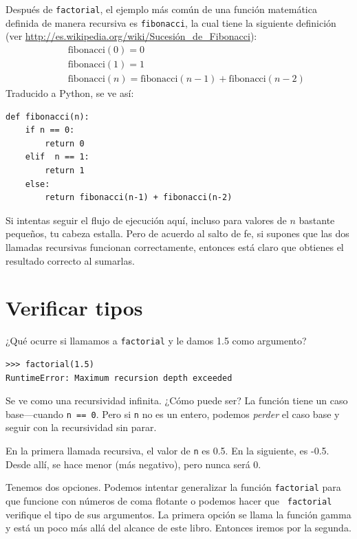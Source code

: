 \documentclass[10pt]{book}
\begin{document}
Después de {\tt factorial}, el ejemplo más común de una función
matemática definida de manera recursiva es {\tt fibonacci}, la cual tiene la
siguiente definición (ver
  \url{http://es.wikipedia.org/wiki/Sucesión_de_Fibonacci}):
%
\begin{eqnarray*}
&& \mathrm{fibonacci}(0) = 0 \\
&& \mathrm{fibonacci}(1) = 1 \\
&& \mathrm{fibonacci}(n) = \mathrm{fibonacci}(n-1) + \mathrm{fibonacci}(n-2)
\end{eqnarray*}
%
Traducido a Python, se ve así:

\begin{verbatim}
def fibonacci(n):
    if n == 0:
        return 0
    elif  n == 1:
        return 1
    else:
        return fibonacci(n-1) + fibonacci(n-2)
\end{verbatim}
%
Si intentas seguir el flujo de ejecución aquí, incluso para valores
de $n$ bastante pequeños, tu cabeza estalla.  Pero de acuerdo al
salto de fe, si supones que las dos llamadas recursivas
funcionan correctamente, entonces está claro que obtienes
el resultado correcto al sumarlas.


\section{Verificar tipos}
\label{guardian}

¿Qué ocurre si llamamos a {\tt factorial} y le damos 1.5 como argumento?

\begin{verbatim}
>>> factorial(1.5)
RuntimeError: Maximum recursion depth exceeded
\end{verbatim}
%
Se ve como una recursividad infinita.  ¿Cómo puede ser?  La función
tiene un caso base---cuando {\tt n == 0}.  Pero si {\tt n} no es un entero,
podemos {\em perder} el caso base y seguir con la recursividad sin parar.

En la primera llamada recursiva, el valor de {\tt n} es 0.5.
En la siguiente, es -0.5.  Desde allí, se hace menor
(más negativo), pero nunca será 0.

Tenemos dos opciones.  Podemos intentar generalizar la función {\tt factorial}
para que funcione con números de coma flotante o podemos hacer que {\tt
  factorial} verifique el tipo de sus argumentos.  La primera opción se
llama la función gamma y está
un poco más allá del alcance de este libro.  Entonces iremos por la segunda.
\end{document}
